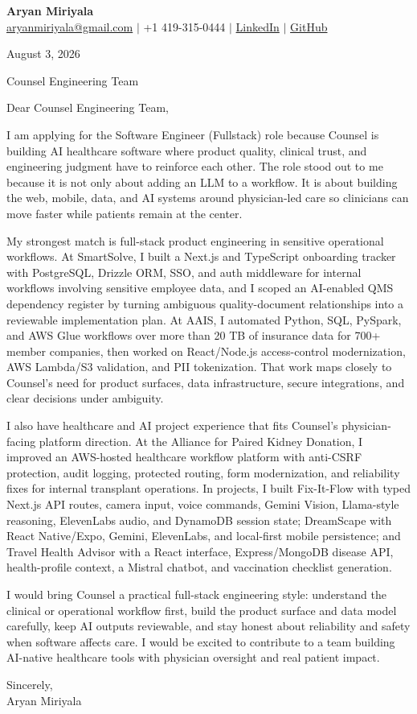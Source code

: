 \documentclass[letterpaper,11pt]{article}
\begin{document}
{\Large\textbf{Aryan Miriyala}}\\
\href{mailto:aryanmiriyala@gmail.com}{aryanmiriyala@gmail.com} $|$ +1 419-315-0444 $|$
\href{https://www.linkedin.com/in/aryan-miriyala-7788a21b6/}{LinkedIn} $|$
\href{https://github.com/aryanmiriyala}{GitHub}

August 3, 2026

Counsel Engineering Team

Dear Counsel Engineering Team,

I am applying for the Software Engineer (Fullstack) role because Counsel is building AI healthcare software where product quality, clinical trust, and engineering judgment have to reinforce each other. The role stood out to me because it is not only about adding an LLM to a workflow. It is about building the web, mobile, data, and AI systems around physician-led care so clinicians can move faster while patients remain at the center.

My strongest match is full-stack product engineering in sensitive operational workflows. At SmartSolve, I built a Next.js and TypeScript onboarding tracker with PostgreSQL, Drizzle ORM, SSO, and auth middleware for internal workflows involving sensitive employee data, and I scoped an AI-enabled QMS dependency register by turning ambiguous quality-document relationships into a reviewable implementation plan. At AAIS, I automated Python, SQL, PySpark, and AWS Glue workflows over more than 20 TB of insurance data for 700+ member companies, then worked on React/Node.js access-control modernization, AWS Lambda/S3 validation, and PII tokenization. That work maps closely to Counsel's need for product surfaces, data infrastructure, secure integrations, and clear decisions under ambiguity.

I also have healthcare and AI project experience that fits Counsel's physician-facing platform direction. At the Alliance for Paired Kidney Donation, I improved an AWS-hosted healthcare workflow platform with anti-CSRF protection, audit logging, protected routing, form modernization, and reliability fixes for internal transplant operations. In projects, I built Fix-It-Flow with typed Next.js API routes, camera input, voice commands, Gemini Vision, Llama-style reasoning, ElevenLabs audio, and DynamoDB session state; DreamScape with React Native/Expo, Gemini, ElevenLabs, and local-first mobile persistence; and Travel Health Advisor with a React interface, Express/MongoDB disease API, health-profile context, a Mistral chatbot, and vaccination checklist generation.

I would bring Counsel a practical full-stack engineering style: understand the clinical or operational workflow first, build the product surface and data model carefully, keep AI outputs reviewable, and stay honest about reliability and safety when software affects care. I would be excited to contribute to a team building AI-native healthcare tools with physician oversight and real patient impact.

Sincerely,\\
Aryan Miriyala
\end{document}
